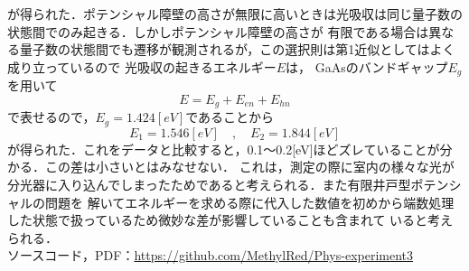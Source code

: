 \documentclass[a4paper,11pt,titlepage]{jsarticle}
\begin{document}
が得られた．ポテンシャル障壁の高さが無限に高いときは光吸収は同じ量子数の状態間でのみ起きる．しかしポテンシャル障壁の高さが
有限である場合は異なる量子数の状態間でも遷移が観測されるが，この選択則は第1近似としてはよく成り立っているので
光吸収の起きるエネルギー$E$は，
GaAsのバンドギャップ$E_g$を用いて
\begin{equation}
    E = E_g + E_{en} + E_{hn}
\end{equation}
で表せるので，$E_g = 1.424[eV]$であることから
\begin{equation}
    E_1 = 1.546[eV]\quad , \quad E_2 = 1.844[eV]
\end{equation}
が得られた．これをデータと比較すると，0.1～0.2[eV]ほどズレていることが分かる．この差は小さいとはみなせない．
これは，測定の際に室内の様々な光が分光器に入り込んでしまったためであると考えられる．また有限井戸型ポテンシャルの問題を
解いてエネルギーを求める際に代入した数値を初めから端数処理した状態で扱っているため微妙な差が影響していることも含まれて
いると考えられる．
\\
\noindent ソースコード，PDF：\url{https://github.com/MethylRed/Phys-experiment3}\\
\end{document}
